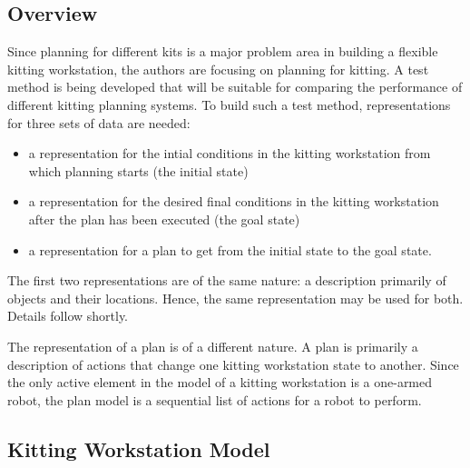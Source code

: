 \subsection{Overview}
Since planning for different kits is a major problem area in building a
flexible kitting workstation, the authors are focusing on planning for
kitting.  A test method is being developed that will be suitable for
comparing the performance of different kitting planning systems.  To build
such a test method, representations for three sets of data are needed:
\begin{itemize}
\item a representation for the intial conditions in the kitting workstation
 from which planning starts (the initial state)

\item a representation for the desired final conditions in the kitting 
workstation after the plan has been executed (the goal state)

\item a representation for a plan to get from the initial state to the goal
state.
\end{itemize}

The first two representations are of the same nature: a description
primarily of objects and their locations. Hence, the same representation
may be used for both. Details follow shortly.

The representation of a plan is of a different nature. A plan is primarily
a description of actions that change one kitting workstation state to
another. Since the only active element in the model of a kitting
workstation is a one-armed robot, the plan model is a sequential
list of actions for a robot to perform.

\subsection{Kitting Workstation Model}


